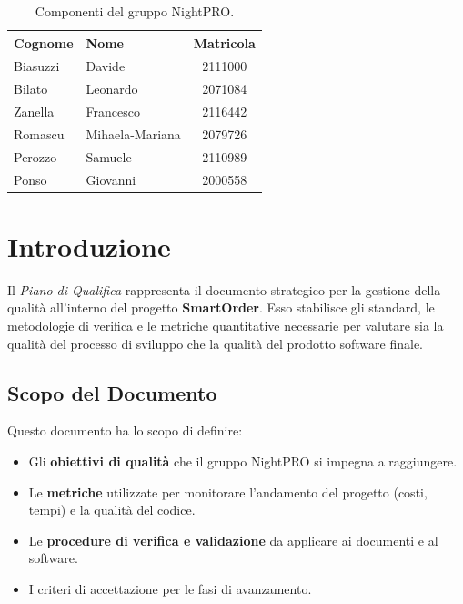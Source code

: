 \documentclass[a4paper,11pt,oneside]{scrartcl}
\begin{document}
\begin{table}[h!]
    \centering
    \renewcommand{\arraystretch}{1.2}
    \begin{tabular}{@{}llc@{}}
        \toprule
        \textbf{Cognome} & \textbf{Nome}   & \textbf{Matricola} \\
        \midrule
        Biasuzzi         & Davide          & 2111000            \\
        Bilato           & Leonardo        & 2071084            \\
        Zanella          & Francesco       & 2116442            \\
        Romascu          & Mihaela-Mariana & 2079726            \\
        Perozzo          & Samuele         & 2110989            \\
        Ponso            & Giovanni        & 2000558            \\
        \bottomrule
    \end{tabular}
    \caption{Componenti del gruppo NightPRO.}
\end{table}

\newpage
\section{Introduzione}

Il \textit{Piano di Qualifica} rappresenta il documento strategico per la gestione della qualità all'interno del progetto \textbf{SmartOrder}. Esso stabilisce gli standard, le metodologie di verifica e le metriche quantitative necessarie per valutare sia la qualità del processo di sviluppo che la qualità del prodotto software finale.

\subsection{Scopo del Documento}
Questo documento ha lo scopo di definire:
\begin{itemize}
    \item Gli \textbf{obiettivi di qualità} che il gruppo NightPRO si impegna a raggiungere.
    \item Le \textbf{metriche} utilizzate per monitorare l'andamento del progetto (costi, tempi) e la qualità del codice.
    \item Le \textbf{procedure di verifica e validazione} da applicare ai documenti e al software.
    \item I criteri di accettazione per le fasi di avanzamento.
\end{itemize}
\end{document}
